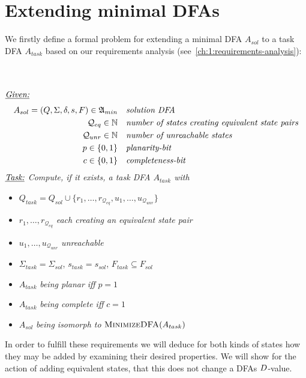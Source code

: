 
\chapter{Extending minimal DFAs} \label{ch:4}

We firstly define a formal problem for extending a minimal DFA $A_{sol}$ to a task DFA $A_{task}$ based on our requirements analysis (see~\ref{ch:1:requirements-analysis}):
\begin{definition}[ExtendMinimalDFA] $ $ \\
	$ $ \vspace{-0.cm} \\
	\noindent $\underline{\emph{Given:}}$
	\vspace{-0.2cm}
	\begin{align*}
	A_{sol} = (Q, \Sigma, \delta, s, F) \in \mathfrak{A}_{min}\ \ \ & \emph{solution DFA} \\
	\mathcal{Q}_{eq} \in \mathbb{N}\ \ \ & \emph{number of states creating equivalent state pairs} \\
	\mathcal{Q}_{unr} \in \mathbb{N}\ \ \ & \emph{number of unreachable states} \\
	p \in \{0,1\}\ \ \ & \emph{planarity-bit} \\
	c \in \{0,1\}\ \ \ & \emph{completeness-bit}
	\end{align*}
	\noindent $\underline{\emph{Task:}}$ \emph{Compute, if it exists, a task DFA $A_{task}$ with}
	\begin{itemize}
		\item $Q_{task} = Q_{sol} \cup \{ r_1, \ldots, r_{\mathcal{Q}_{eq}}, u_1, \ldots, u_{\mathcal{Q}_{unr}} \}$
		\item $r_1, \ldots, r_{\mathcal{Q}_{eq}}$ \emph{each creating an equivalent state pair}
		\item $u_1, \ldots, u_{\mathcal{Q}_{unr}}$ \emph{unreachable}
		\item $\Sigma_{task} = \Sigma_{sol}$, $s_{task} = s_{sol}$, $F_{task} \subseteq F_{sol}$
		\item $A_{task}$ \emph{being planar iff} $p = 1$
		\item $A_{task}$ \emph{being complete iff} $c = 1$
		\item $A_{sol}$ \emph{being isomorph to} $\textsc{MinimizeDFA}(A_{task})$
	\end{itemize}
\end{definition}
\noindent In order to fulfill these requirements we will deduce for both kinds of states how they may be added by examining their desired properties. We will show for the action of adding equivalent states, that this does not change a DFAs $D$-value.

